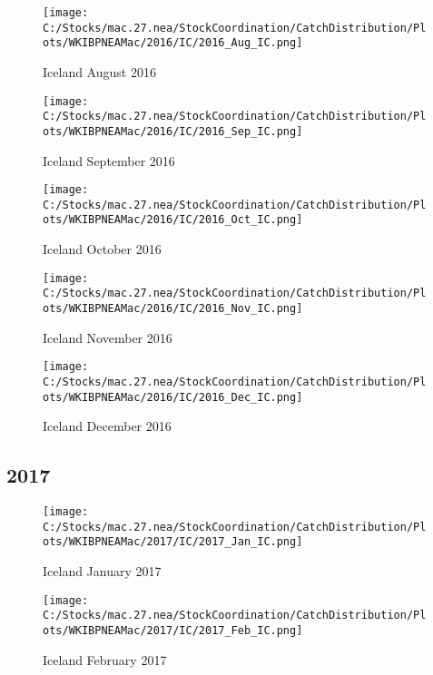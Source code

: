 \documentclass{article}
\begin{document}
\begin{figure}
	\centering
		\texttt{[image: C:/Stocks/mac.27.nea/StockCoordination/CatchDistribution/Plots/WKIBPNEAMac/2016/IC/2016\_Aug\_IC.png]}
	\caption{Iceland August 2016}
	\label{fig:2016_Aug_IC}
\end{figure}

\begin{figure}
	\centering
		\texttt{[image: C:/Stocks/mac.27.nea/StockCoordination/CatchDistribution/Plots/WKIBPNEAMac/2016/IC/2016\_Sep\_IC.png]}
	\caption{Iceland September 2016}
	\label{fig:2016_Sep_IC}
\end{figure}

\begin{figure}
	\centering
		\texttt{[image: C:/Stocks/mac.27.nea/StockCoordination/CatchDistribution/Plots/WKIBPNEAMac/2016/IC/2016\_Oct\_IC.png]}
	\caption{Iceland October 2016}
	\label{fig:2016_Oct_IC}
\end{figure}

\begin{figure}
	\centering
		\texttt{[image: C:/Stocks/mac.27.nea/StockCoordination/CatchDistribution/Plots/WKIBPNEAMac/2016/IC/2016\_Nov\_IC.png]}
	\caption{Iceland November 2016}
	\label{fig:2016_Nov_IC}
\end{figure}

\begin{figure}
	\centering
		\texttt{[image: C:/Stocks/mac.27.nea/StockCoordination/CatchDistribution/Plots/WKIBPNEAMac/2016/IC/2016\_Dec\_IC.png]}
	\caption{Iceland December 2016}
	\label{fig:2016_Dec_IC}
\end{figure}


\clearpage

\newpage

\subsection{2017}



\begin{figure}[h]
	\centering
		\texttt{[image: C:/Stocks/mac.27.nea/StockCoordination/CatchDistribution/Plots/WKIBPNEAMac/2017/IC/2017\_Jan\_IC.png]}
	\caption{Iceland January 2017}
	\label{fig:2017_Jan_IC}
\end{figure}

\begin{figure}
	\centering
		\texttt{[image: C:/Stocks/mac.27.nea/StockCoordination/CatchDistribution/Plots/WKIBPNEAMac/2017/IC/2017\_Feb\_IC.png]}
	\caption{Iceland February 2017}
	\label{fig:2017_Feb_IC}
\end{figure}
\end{document}
